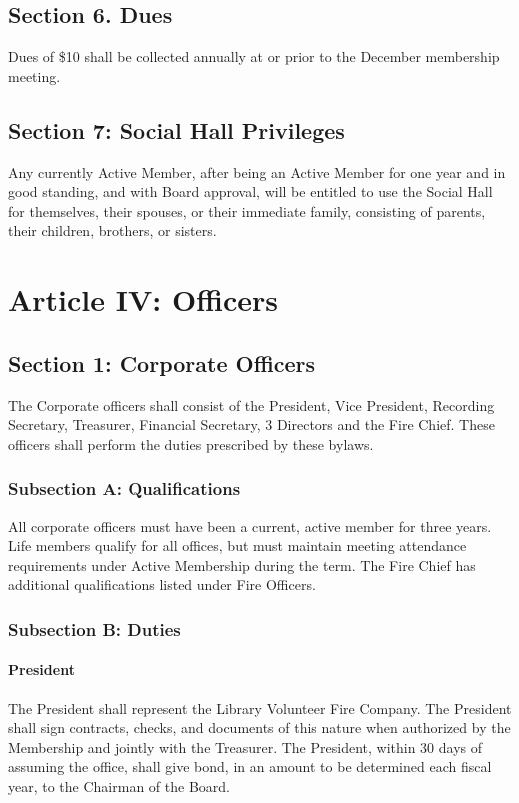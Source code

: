 ﻿\documentclass[12pt,letterpaper]{article}
\begin{document}
\subsection*{Section 6. Dues}
Dues of \$10 shall be collected annually at or prior to the December membership meeting.

\subsection*{Section 7: Social Hall Privileges}
Any currently Active Member, after being an Active Member for one year and in good standing, and with Board approval, will be entitled to use the Social Hall for themselves, their spouses, or their immediate family, consisting of parents, their children, brothers, or sisters.

\section*{Article IV: Officers}

\subsection*{Section 1: Corporate Officers}
The Corporate officers shall consist of the President, Vice President, Recording Secretary, Treasurer, Financial Secretary, 3 Directors and the Fire Chief.  These officers shall perform the duties prescribed by these bylaws.

\subsubsection*{Subsection A: Qualifications}
All corporate officers must have been a current, active member for three years.  Life members qualify for all offices, but must maintain meeting attendance requirements under Active Membership during the term.  The Fire Chief has additional qualifications listed under Fire Officers.

\subsubsection*{Subsection B: Duties}
\paragraph{President}
The President shall represent the Library Volunteer Fire Company.  The President shall sign contracts, checks, and documents of this nature when authorized by the Membership and jointly with the Treasurer. The President, within 30 days of assuming the office, shall give bond, in an amount to be determined each fiscal year, to the Chairman of the Board.
\end{document}
